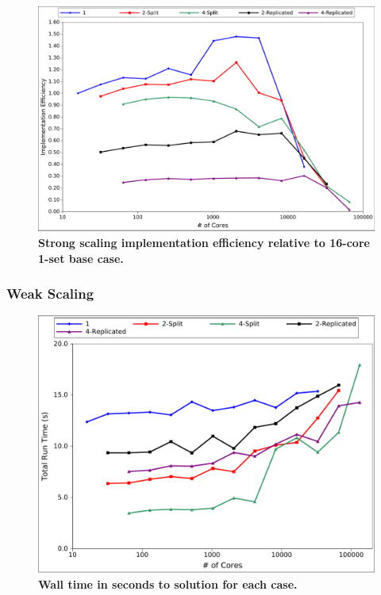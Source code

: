 \begin{figure}[htpb!]
  \begin{center}
    \includegraphics[width=6in]{chapters/parallel_mc/titan_strong_ms_impeff.pdf}
  \end{center}
  \caption{\textbf{Strong scaling implementation efficiency relative
      to 16-core 1-set base case.}}
  \label{fig:titan_strong_ms_impeff}
\end{figure}

\clearpage

\subsubsection{Weak Scaling}
\label{subsubsec:msod_weak}

\begin{figure}[htpb!]
  \begin{center}
    \includegraphics[width=6in]{chapters/parallel_mc/titan_weak_ms_time.pdf}
  \end{center}
  \caption{\textbf{Wall time in seconds to solution for each case.}}
  \label{fig:titan_weak_ms_time}
\end{figure}

